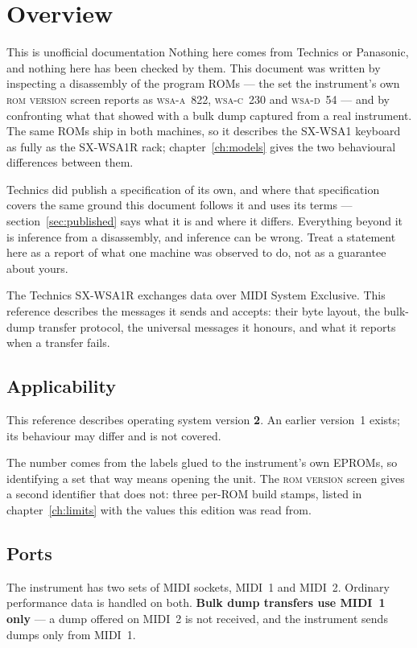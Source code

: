 \chapter{Overview}\label{ch:overview}

\begin{caution}{This is unofficial documentation}
Nothing here comes from Technics or Panasonic, and nothing here has been checked by them.
This document was written by inspecting a disassembly of the program ROMs --- the set the
instrument's own \textsc{rom version} screen reports as \textsc{wsa-a}~822,
\textsc{wsa-c}~230 and \textsc{wsa-d}~54 --- and by confronting what that showed with a
bulk dump captured from a real instrument. The same ROMs ship in both machines, so it describes the SX-WSA1 keyboard
as fully as the SX-WSA1R rack; chapter~\ref{ch:models} gives the two behavioural
differences between them.

Technics did publish a specification of its own, and where that specification covers the
same ground this document follows it and uses its terms --- section~\ref{sec:published} says what it is and
where it differs. Everything beyond it is inference from a disassembly, and inference can
be wrong. Treat a statement here as a report of what one machine was observed to do, not
as a guarantee about yours.
\end{caution}

The Technics SX-WSA1R exchanges data over MIDI System Exclusive. This reference describes
the messages it sends and accepts: their byte layout, the bulk-dump transfer protocol, the
universal messages it honours, and what it reports when a transfer fails.

\section{Applicability}
This reference describes operating system version \textbf{2}. An earlier version~1 exists;
its behaviour may differ and is not covered.

The number comes from the labels glued to the instrument's own EPROMs, so identifying a set
that way means opening the unit. The \textsc{rom version} screen gives a second identifier
that does not: three per-ROM build stamps, listed in chapter~\ref{ch:limits} with the
values this edition was read from.

\section{Ports}
The instrument has two sets of MIDI sockets, MIDI~1 and MIDI~2. Ordinary performance data
is handled on both. \textbf{Bulk dump transfers use MIDI~1 only} --- a dump offered on
MIDI~2 is not received, and the instrument sends dumps only from MIDI~1.

